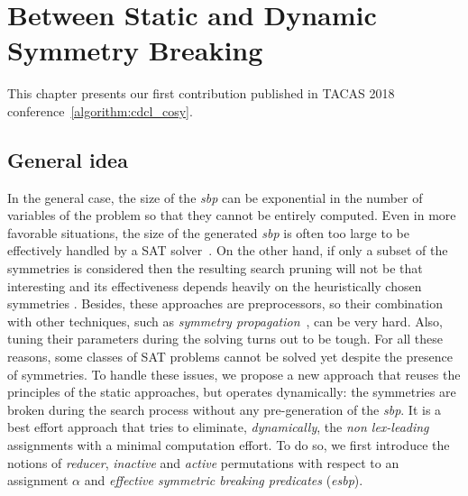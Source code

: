 \chapter{Between Static and Dynamic\\ Symmetry Breaking}\label{chap:symmSAT}
\minitoc
This chapter presents our first contribution published in TACAS 2018 conference~\ref{algorithm:cdcl_cosy}. 
\section{General idea}
In the general case,
the size of the \textit{sbp} can be exponential in the number of variables of
the problem so that they cannot be entirely computed. Even in more favorable
situations, the size of the generated \textit{sbp} is often too large to be
effectively handled by a SAT solver~\cite{Luks2004}. On the other hand, if
only a subset of the symmetries is considered then the resulting search pruning
will not be that interesting and its effectiveness depends heavily on the
heuristically chosen symmetries \cite{biere2009handbook}. Besides, these approaches
are preprocessors, so their combination with other techniques, such as
\emph{symmetry propagation}~\cite{Devriendt12}, can be very hard. Also, tuning
their parameters during the solving turns out to be tough. For all
these reasons, some classes of SAT problems cannot be solved yet despite
the presence of symmetries.
To handle these issues, we propose a new
approach that reuses the principles of the static approaches, but operates
dynamically: the symmetries are broken during the search process without any
pre-generation of the \textit{sbp}. It is a best effort approach that tries to eliminate,
\textit{dynamically}, the \textit{non lex-leading} assignments with a minimal
computation effort. To do so, we first introduce the notions of
\textit{reducer}, \textit{inactive} and \textit{active} permutations with
respect to an assignment $\alpha$ and \emph{effective symmetric breaking predicates} (\emph{esbp}).

